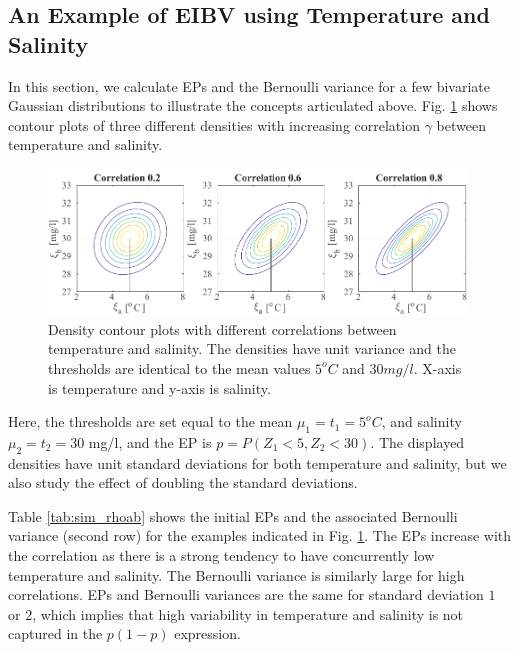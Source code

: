 \documentclass[aoas]{imsart}
\begin{document}
\subsection{An Example of EIBV using Temperature and Salinity}

In this section, we calculate EPs and the Bernoulli variance for a few bivariate
Gaussian distributions to illustrate the concepts articulated above.
Fig. \ref{illus_bivarDens} shows contour plots of three different
densities with increasing correlation $\gamma$ between temperature and
salinity.
\begin{figure}[h!] \centering
  \includegraphics[width=0.99\textwidth]{Figures/illus_bivar.pdf}
  \caption{Density contour plots with different correlations between
    temperature and salinity. The densities have unit variance and the
    thresholds are identical to the mean values $5^o C$ and
    $30 mg/l$. X-axis is temperature and y-axis is salinity.}
\label{illus_bivarDens}
\end{figure}
Here, the thresholds are set equal to the mean $\mu_1=t_1=5^o C$, and
salinity $\mu_2=t_2=30$ mg/l, and the EP is $p=P(Z_1 < 5,Z_2 < 30)$. The displayed densities have unit
standard deviations for both temperature and salinity, but we also
study the effect of doubling the standard deviations.

Table \ref{tab:sim_rhoab} shows the initial EPs and the associated Bernoulli
variance (second row) for the examples indicated in
Fig. \ref{illus_bivarDens}. The EPs increase with the correlation as
there is a strong tendency to have concurrently low temperature and
salinity. The Bernoulli variance is similarly large for high
correlations. EPs and Bernoulli variances are the same for standard
deviation $1$ or $2$, which implies that high variability in
temperature and salinity is not captured in the $p(1-p)$ expression.
\end{document}
